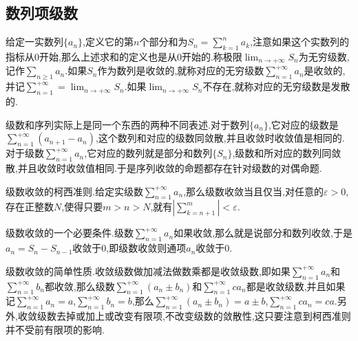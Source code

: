 \subsection{数列项级数}

给定一实数列$\{a_n\}$,定义它的第$n$个部分和为$S_n=\sum_{k=1}^{n}a_k$,注意如果这个实数列的指标从0开始,那么上述求和的定义也是从0开始的.称极限$\lim_{n\to+\infty}S_n$为无穷级数,记作$\sum_{n\ge1}a_n$.如果$S_n$作为数列是收敛的,就称对应的无穷级数$\sum_{n=1}^{+\infty}a_n$是收敛的,并记$\sum_{n=1}^{+\infty}=\lim_{n\to+\infty}S_n$.如果$\lim_{n\to+\infty}S_n$不存在,就称对应的无穷级数是发散的.

级数和序列实际上是同一个东西的两种不同表述.对于数列$\{a_n\}$,它对应的级数是$\sum_{n=1}^{+\infty}\left(a_{n+1}-a_n\right)$,这个数列和对应的级数同敛散,并且收敛时收敛值是相同的.对于级数$\sum_{n=1}^{+\infty}a_n$,它对应的数列就是部分和数列$\{S_n\}$,级数和所对应的数列同敛散,并且收敛时收敛值相同.于是序列收敛的命题都存在针对级数的对偶命题.

级数收敛的柯西准则.给定实级数$\sum_{n=1}^{+\infty}a_n$,那么级数收敛当且仅当,对任意的$\varepsilon>0$,存在正整数$N$,使得只要$m>n>N$,就有$\left|\sum_{k=n+1}^{m}\right|<\varepsilon$.

级数收敛的一个必要条件.级数$\sum_{n=1}^{+\infty}a_n$如果收敛,那么就是说部分和数列收敛,于是$a_n=S_{n}-S_{n-1}$收敛于0,即级数收敛则通项$a_n$收敛于0.

级数收敛的简单性质.收敛级数做加减法做数乘都是收敛级数,即如果$\sum_{n=1}^{+\infty}a_n$和$\sum_{n=1}^{+\infty}b_n$都收敛,那么级数$\sum_{n=1}^{+\infty}\left(a_n\pm b_n\right)$和$\sum_{n=1}^{+\infty}ca_n$都是收敛级数,并且如果记$\sum_{n=1}^{+\infty}a_n=a$,$\sum_{n=1}^{+\infty}b_n=b$,那么$\sum_{n=1}^{+\infty}\left(a_n\pm b_n\right)=a\pm b$,$\sum_{n=1}^{+\infty}ca_n=ca$.另外,收敛级数去掉或加上或改变有限项,不改变级数的敛散性,这只要注意到柯西准则并不受前有限项的影响.

